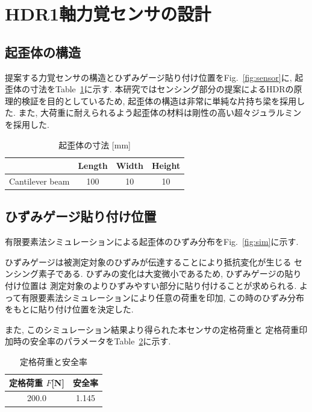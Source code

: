 \section{HDR1軸力覚センサの設計}
\subsection{起歪体の構造}
提案する力覚センサの構造とひずみゲージ貼り付け位置をFig.~\ref{fig:sensor}に, 
起歪体の寸法をTable~\ref{tb:size}に示す.
本研究ではセンシング部分の提案によるHDRの原理的検証を目的としているため, 
起歪体の構造は非常に単純な片持ち梁を採用した. 
また, 大荷重に耐えられるよう起歪体の材料は剛性の高い超々ジュラルミンを採用した. 


\begin{table}[h]
  \caption{起歪体の寸法 [mm]}\label{tb:size}
  \begin{center}
   \begin{tabular}{ c c c c }
    \hline
     & Length & Width & Height  \\
    \hline
    Cantilever beam & 100 & 10 & 10  \\
    \hline   
   \end{tabular}
  \end{center}
 \end{table}

\subsection{ひずみゲージ貼り付け位置}
有限要素法シミュレーションによる起歪体のひずみ分布をFig.~\ref{fig:sim}に示す.

ひずみゲージは被測定対象のひずみが伝達することにより抵抗変化が生じる
センシング素子である. 
ひずみの変化は大変微小であるため, ひずみゲージの貼り付け位置は
測定対象のよりひずみやすい部分に貼り付けることが求められる. 
よって有限要素法シミュレーションにより任意の荷重を印加, 
この時のひずみ分布をもとに貼り付け位置を決定した. 

また, このシミュレーション結果より得られた本センサの定格荷重と
定格荷重印加時の安全率のパラメータをTable~\ref{tb:kajuu}に示す.

\begin{table}[h]
  \caption{定格荷重と安全率}\label{tb:kajuu}
  \begin{center}
   \begin{tabular}{ c c }
    \hline
    定格荷重 $F$[N] & 安全率 \\
    \hline
    200.0 & 1.145 \\
    \hline   
   \end{tabular}
  \end{center}
 \end{table}

